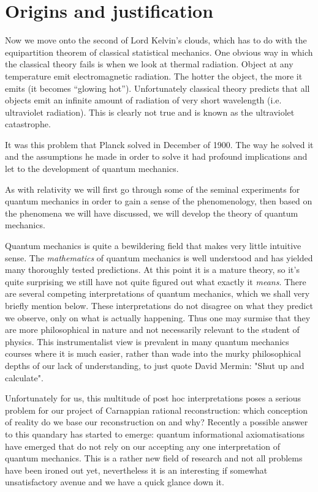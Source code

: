 \chapter{Origins and justification}
Now we move onto the second of Lord Kelvin's clouds, which has to do with the equipartition theorem of classical statistical mechanics. One obvious way in which the classical theory fails is when we look at thermal radiation. Object at any temperature emit electromagnetic radiation. The hotter the object, the more it emits (it becomes ``glowing hot''). Unfortunately classical theory predicts that all objects emit an infinite amount of radiation of very short wavelength (i.e. ultraviolet radiation). This is clearly not true and is known as the ultraviolet catastrophe.

It was this problem that Planck solved in December of 1900. The way he solved it and the assumptions he made in order to solve it had profound implications and let to the development of quantum mechanics.

As with relativity we will first go through some of the seminal experiments for quantum mechanics in order to gain a sense of the phenomenology, then based on the phenomena we will have discussed, we will develop the theory of quantum mechanics.

Quantum mechanics is quite a bewildering field that makes very little intuitive sense. The \textit{mathematics} of quantum mechanics is well understood and has yielded many thoroughly tested predictions. At this point it is a mature theory, so it's quite surprising we still have not quite figured out what exactly it \textit{means}. There are several competing interpretations of quantum mechanics, which we shall very briefly mention below. These interpretations do not disagree on what they predict we observe, only on what is actually happening. Thus one may surmise that they are more philosophical in nature and not necessarily relevant to the student of physics. This instrumentalist view is prevalent in many quantum mechanics courses where it is much easier, rather than wade into the murky philosophical depths of our lack of understanding, to just quote David Mermin: "Shut up and calculate".

Unfortunately for us, this multitude of post hoc interpretations poses a serious problem for our project of Carnappian rational reconstruction: which conception of reality do we base our reconstruction on and why? Recently a possible answer to this quandary has started to emerge: quantum informational axiomatisations have emerged that do not rely on our accepting any one interpretation of quantum mechanics. This is a rather new field of research and not all problems have been ironed out yet, nevertheless it is an interesting if somewhat unsatisfactory avenue and we have a quick glance down it.

